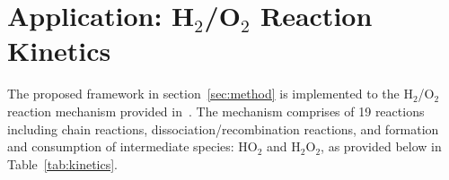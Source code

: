 \section{Application: H$_2$/O$_2$ Reaction Kinetics}
\label{sec:app}

%
%

The proposed framework in section~\ref{sec:method} is implemented to 
the H$_2$/O$_2$ reaction mechanism provided in~\cite{Yetter:1991}.
The mechanism comprises of 19 reactions including chain reactions,
dissociation/recombination reactions, and formation and consumption
of intermediate species: HO$_2$ and H$_2$O$_2$, as provided below
in Table~\ref{tab:kinetics}.

